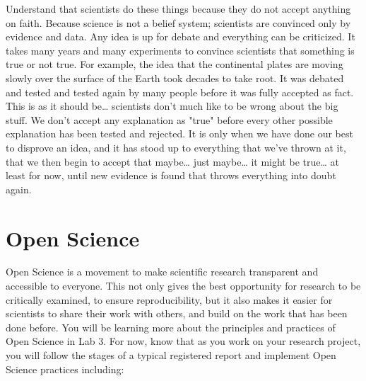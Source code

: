 \documentclass[
]{book}
\begin{document}
Understand that scientists do these things because they do not accept anything on faith. Because science is not a belief system; scientists are convinced only by evidence and data. Any idea is up for debate and everything can be criticized. It takes many years and many experiments to convince scientists that something is true or not true. For example, the idea that the continental plates are moving slowly over the surface of the Earth took decades to take root. It was debated and tested and tested again by many people before it was fully accepted as fact. This is as it should be\ldots{} scientists don't much like to be wrong about the big stuff. We don't accept any explanation as "true" before every other possible explanation has been tested and rejected. It is only when we have done our best to disprove an idea, and it has stood up to everything that we've thrown at it, that we then begin to accept that maybe\ldots{} just maybe\ldots{} it might be true\ldots{} at least for now, until new evidence is found that throws everything into doubt again.

\hypertarget{open-science}{%
\section*{Open Science}\label{open-science}}

Open Science is a movement to make scientific research transparent and accessible to everyone. This not only gives the best opportunity for research to be critically examined, to ensure reproducibility, but it also makes it easier for scientists to share their work with others, and build on the work that has been done before. You will be learning more about the principles and practices of Open Science in Lab 3. For now, know that as you work on your research project, you will follow the stages of a typical registered report and implement Open Science practices including:
\end{document}
